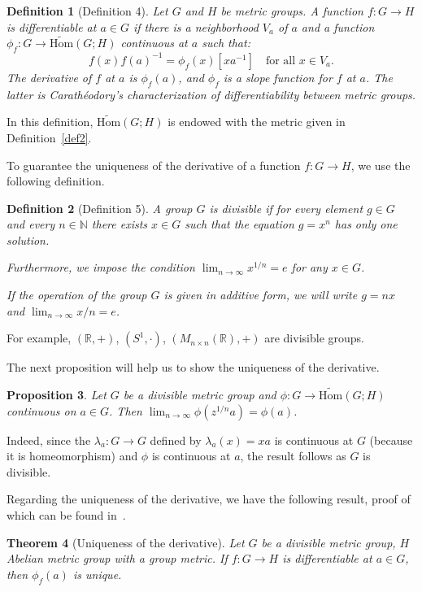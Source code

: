 \documentclass{article}
\newtheorem{theorem}{Theorem}[section]
\newtheorem{proposition}[theorem]{Proposition}
\newtheorem{definition}[theorem]{Definition}
\numberwithin{theorem}{section}
\numberwithin{equation}{section}
\begin{document}
\begin{definition}[Definition 4]\label{def4}
Let $G$ and $H$ be metric groups. A function $f : G \to H$ is differentiable at $a \in G$ if there is a neighborhood $V_a$ of $a$ and a function $\phi_f : G \to \tilde{\mathrm{Hom}}(G; H)$ continuous at $a$ such that:
\[
f(x) f(a)^{-1} = \phi_f(x)[x a^{-1}] \quad \text{for all } x \in V_a.
\]
The derivative of $f$ at $a$ is $\phi_f(a)$, and $\phi_f$ is a slope function for $f$ at $a$. The latter is Carathéodory's characterization of differentiability between metric groups.
\end{definition}

In this definition, $\tilde{\mathrm{Hom}}(G; H)$ is endowed with the metric given in Definition~\ref{def2}.

To guarantee the uniqueness of the derivative of a function $f : G \to H$, we use the following definition.

\begin{definition}[Definition 5]\label{def5}
A group $G$ is divisible if for every element $g \in G$ and every $n \in \mathbb{N}$ there exists $x \in G$ such that the equation $g = x^n$ has only one solution.

Furthermore, we impose the condition $\lim_{n\to\infty} x^{1/n} = e$ for any $x \in G$.

If the operation of the group $G$ is given in additive form, we will write $g = n x$ and $\lim_{n\to\infty} x/n = e$.
\end{definition}

For example, $(\mathbb{R}, +)$, $(S^1, \cdot)$, $(M_{n\times n}(\mathbb{R}), +)$ are divisible groups.

The next proposition will help us to show the uniqueness of the derivative.

\begin{proposition}\label{prop4}
Let $G$ be a divisible metric group and $\phi : G \to \tilde{\mathrm{Hom}}(G; H)$ continuous on $a \in G$. Then $\lim_{n\to\infty} \phi(z^{1/n} a) = \phi(a)$.
\end{proposition}

Indeed, since the $\lambda_a : G \to G$ defined by $\lambda_a(x) = x a$ is continuous at $G$ (because it is homeomorphism) and $\phi$ is continuous at $a$, the result follows as $G$ is divisible.

Regarding the uniqueness of the derivative, we have the following result, proof of which can be found in~\cite{granada2006}.

\begin{theorem}[Uniqueness of the derivative]\label{thm2}
Let $G$ be a divisible metric group, $H$ Abelian metric group with a group metric. If $f : G \to H$ is differentiable at $a \in G$, then $\phi_f(a)$ is unique.
\end{theorem}
\end{document}
